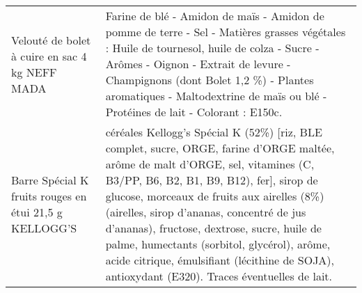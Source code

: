 \begin{longtable}{p{5cm}p{10cm}}
                                                           Velouté de bolet à cuire en sac 4 kg NEFF MADA &                                                                                                                                                                                                                                                                                                                                                                                                                                                                                                                                                                                                                                                                                                                            Farine de blé - Amidon de maïs - Amidon de pomme de terre - Sel - Matières grasses végétales : Huile de tournesol, huile de colza - Sucre - Arômes - Oignon - Extrait de levure - Champignons (dont Bolet 1,2 \%) - Plantes aromatiques - Maltodextrine de maïs ou blé - Protéines de lait - Colorant : E150c. \\
                                                   Barre Spécial K fruits rouges en étui 21,5 g KELLOGG'S &                                                                                                                                                                                                                                                                                                                                                                                                                                                                                                                                                                  céréales Kellogg's Spécial K (52\%) [riz, BLE complet, sucre, ORGE, farine d'ORGE maltée, arôme de malt d'ORGE, sel, vitamines (C, B3/PP, B6, B2, B1, B9, B12), fer], sirop de glucose, morceaux de fruits aux airelles (8\%) (airelles, sirop d'ananas, concentré de jus d'ananas), fructose, dextrose, sucre, huile de palme, humectants (sorbitol, glycérol), arôme, acide citrique, émulsifiant (lécithine de SOJA), antioxydant (E320).  Traces éventuelles de lait. \\

\end{longtable}
